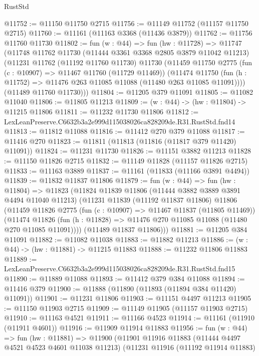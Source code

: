 \begin{lexlean}{RustStd}
\begin{coremodule}
@11752 := @11150 @11750 @2715
@11756 := @11149 @11752 (@11157 @11750 @2715)
@11760 := @11161 (@11163 @3368 (@11436 @3879))
@11762 := @11756 @11760 @11730
@11802 := fun (w : @44) =>
  fun (hw : @11728) =>
  @11747
    (@11748
      @11762
      @11730
      (@11444 @3361 @3368 @2805 @3879 @11042 @11213)
      (@11231
        @11762
        (@11192 @11760 @11730)
        @11730
        (@11459
          @11750
          @2775
          (fun (c : @10907) => @11467 @11760 (@11729 @11469))
          (@11474
            @11750
            (fun (h : @11752) => @11476 @263 @11085 @11088 (@11480 @263 @11085 @11091))))
        (@11489 @11760 @11730)))
@11804 := @11205 @379 @11091
@11805 := @11082 @11040
@11806 := @11805 @11213
@11809 := (w : @44) -> (hw : @11804) -> @11215 @11806
@11811 := @11232 @11730 @11806
@11812 := LexLeanPreserve.C6632b3a2e999d115038026ca828209de.R31.RustStd.fnd14
@11813 := @11812 @11088
@11816 := @11412 @270 @379 @11088
@11817 := @11416 @270
@11823 := @11811 (@11813 (@11816 (@11817 @379 @11420) @11091))
@11824 := @11231 @11730
@11826 := @11151 @3882 @11213
@11828 := @11150 @11826 @2715
@11832 := @11149 @11828 (@11157 @11826 @2715)
@11833 := @11163 @3889
@11837 := @11161 (@11833 (@11166 @3891 @4494))
@11839 := @11832 @11837 @11806
@11879 := fun (w : @44) =>
  fun (hw : @11804) =>
  @11823
    (@11824
      @11839
      @11806
      (@11444 @3882 @3889 @3891 @4494 @11040 @11213)
      (@11231
        @11839
        (@11192 @11837 @11806)
        @11806
        (@11459
          @11826
          @2775
          (fun (c : @10907) => @11467 @11837 (@11805 @11469))
          (@11474
            @11826
            (fun (h : @11828) => @11476 @270 @11085 @11088 (@11480 @270 @11085 @11091))))
        (@11489 @11837 @11806)))
@11881 := @11205 @384 @11091
@11882 := @11082 @11038
@11883 := @11882 @11213
@11886 := (w : @44) -> (hw : @11881) -> @11215 @11883
@11888 := @11232 @11806 @11883
@11889 := LexLeanPreserve.C6632b3a2e999d115038026ca828209de.R31.RustStd.fnd15
@11890 := @11889 @11088
@11893 := @11412 @379 @384 @11088
@11894 := @11416 @379
@11900 := @11888 (@11890 (@11893 (@11894 @384 @11420) @11091))
@11901 := @11231 @11806
@11903 := @11151 @4497 @11213
@11905 := @11150 @11903 @2715
@11909 := @11149 @11905 (@11157 @11903 @2715)
@11910 := @11163 @4521
@11911 := @11166 @4523
@11914 := @11161 (@11910 (@11911 @4601))
@11916 := @11909 @11914 @11883
@11956 := fun (w : @44) =>
  fun (hw : @11881) =>
  @11900
    (@11901
      @11916
      @11883
      (@11444 @4497 @4521 @4523 @4601 @11038 @11213)
      (@11231
        @11916
        (@11192 @11914 @11883)

\end{coremodule}
\end{lexlean}
